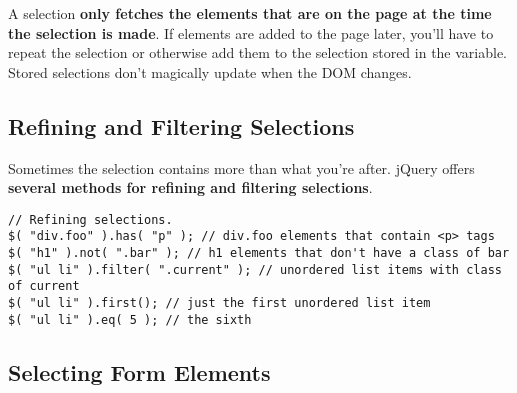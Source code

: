 \documentclass[10pt,letterpaper]{book}
\begin{document}
A selection \textbf{only fetches the elements that are on the page at the time the selection is made}. If elements are added to the page later, you'll have to repeat the selection or otherwise add them to the selection stored in the variable. Stored selections don't magically update when the DOM changes.

\subsection{Refining and Filtering Selections}
Sometimes the selection contains more than what you're after. jQuery offers \textbf{several methods for refining and filtering selections}.
\begin{lstlisting}
// Refining selections.
$( "div.foo" ).has( "p" ); // div.foo elements that contain <p> tags
$( "h1" ).not( ".bar" ); // h1 elements that don't have a class of bar
$( "ul li" ).filter( ".current" ); // unordered list items with class of current
$( "ul li" ).first(); // just the first unordered list item
$( "ul li" ).eq( 5 ); // the sixth
\end{lstlisting}
\subsection{Selecting Form Elements}
\end{document}

